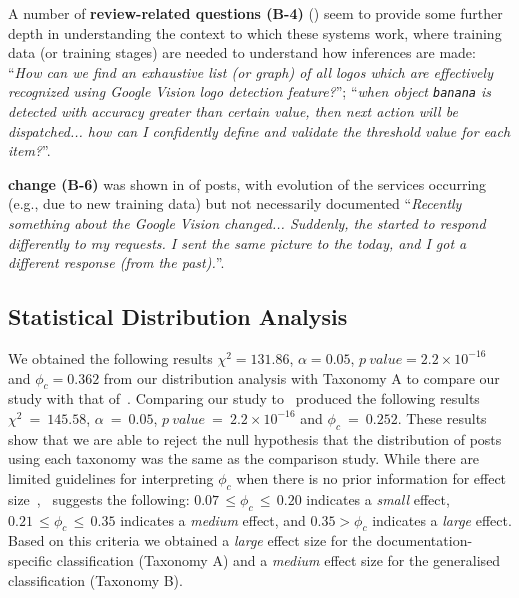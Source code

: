 %
A number of \textbf{review-related questions (B-4)} (\PctTaxBReview{}) seem to provide some further depth in understanding the context to which these systems work, where training data (or training stages) are needed to understand how inferences are made: ``\textit{How can we find an exhaustive list (or graph) of all logos which are effectively recognized using Google Vision logo detection feature?}''; ``\textit{when object \texttt{banana} is detected with accuracy greater than certain value, then next action will be dispatched... how can I confidently define and validate the threshold value for each item?}''.

%
\textbf{ change (B-6)} was shown in \PctTaxBAPIChange{} of posts, with evolution of the services occurring (e.g., due to new training data) but not necessarily documented ``\textit{Recently something about the Google Vision  changed... Suddenly, the  started to respond differently to my requests. I sent the same picture to the  today, and I got a different response (from the past).}''.

%


%


%

\subsection{Statistical Distribution Analysis}
\label{icse2020:sec:statistical-distribution-analysis}

We obtained the following results $\chi^2 = 131.86$, $\alpha = 0.05$, $p\ value = 2.2 \times 10^{-16}$ and $\phi_c=0.362$ from our distribution analysis with Taxonomy A to compare our study with that of~\citet{Aghajani:2019bo}. Comparing our study to~\citet{Beyer:2018fm} produced the following results $\chi^2~=~145.58$, $\alpha~=~0.05$, $p\ value~=~2.2 \times 10^{-16}$ and $\phi_c~=~0.252$. These results show that we are able to reject the null hypothesis that the distribution of posts using each taxonomy was the same as the comparison study. While there are limited guidelines for interpreting \(\phi_c\) when there is no prior information for effect size~\citep{Sun:2010ut},~\citeauthor{Sun:2010ut} suggests the following: $0.07\,\leq \phi_c\,\leq\,0.20$  indicates a \textit{small} effect, $0.21\,\leq \phi_c\,\leq\,0.35$ indicates a \textit{medium} effect, and $0.35 > \phi_c$ indicates a \textit{large} effect. Based on this criteria we obtained a \textit{large} effect size for the documentation-specific classification (Taxonomy A) and a \textit{medium} effect size for the generalised classification (Taxonomy B).

